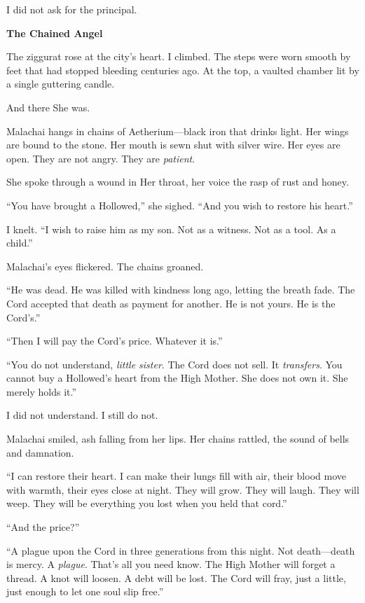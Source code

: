 \documentclass[11pt]{article}
\newenvironment{founddocument}{%
  \begin{mdframed}[backgroundcolor=horrorbg, linecolor=bloodcolor, linewidth=1pt, leftmargin=0.5cm, rightmargin=0.5cm]
  \setlength{\parskip}{0.8em}
}{%
  \end{mdframed}
}
\begin{document}
\begin{founddocument}
I did not ask for the principal.

\vspace{1em}
\noindent
\textbf{The Chained Angel}

The ziggurat rose at the city's heart. I climbed. The steps were worn smooth by feet that had stopped bleeding centuries ago. At the top, a vaulted chamber lit by a single guttering candle.

And there She was.

Malachai hangs in chains of Aetherium---black iron that drinks light. Her wings are bound to the stone. Her mouth is sewn shut with silver wire. Her eyes are open. They are not angry. They are \emph{patient}.

She spoke through a wound in Her throat, her voice the rasp of rust and honey.

``You have brought a Hollowed,'' she sighed. ``And you wish to restore his heart.''

I knelt. ``I wish to raise him as my son. Not as a witness. Not as a tool. As a child.''

Malachai's eyes flickered. The chains groaned.

``He was dead. He was killed with kindness long ago, letting the breath fade. The Cord accepted that death as payment for another. He is not yours. He is the Cord's.''

``Then I will pay the Cord's price. Whatever it is.''

``You do not understand, \emph{little sister}. The Cord does not sell. It \emph{transfers}. You cannot buy a Hollowed's heart from the High Mother. She does not own it. She merely holds it.''

I did not understand. I still do not.

Malachai smiled, ash falling from her lips. Her chains rattled, the sound of bells and damnation.

``I can restore their heart. I can make their lungs fill with air, their blood move with warmth, their eyes close at night. They will grow. They will laugh. They will weep. They will be everything you lost when you held that cord.''

``And the price?''

``A plague upon the Cord in three generations from this night. Not death---death is mercy. A \emph{plague}. That's all you need know. The High Mother will forget a thread. A knot will loosen. A debt will be lost. The Cord will fray, just a little, just enough to let one soul slip free.''


\end{founddocument}
\end{document}
